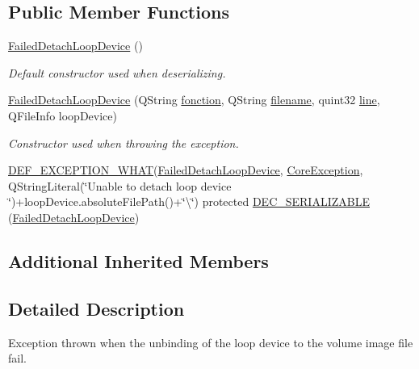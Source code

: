 \subsection*{Public Member Functions}
\begin{DoxyCompactItemize}
\item 
\hyperlink{class_gost_crypt_1_1_core_1_1_failed_detach_loop_device_a6df735e0deafe5aa995fdb4226ca7058}{Failed\+Detach\+Loop\+Device} ()
\begin{DoxyCompactList}\small\item\em Default constructor used when deserializing. \end{DoxyCompactList}\item 
\hyperlink{class_gost_crypt_1_1_core_1_1_failed_detach_loop_device_a6583fca405ad2531d902daf9459e1fbe}{Failed\+Detach\+Loop\+Device} (Q\+String \hyperlink{class_gost_crypt_1_1_gost_crypt_exception_a29b8c93d5efbb1ff369107385725a939}{fonction}, Q\+String \hyperlink{class_gost_crypt_1_1_gost_crypt_exception_a749a12375f4ba9d502623b99d8252f38}{filename}, quint32 \hyperlink{class_gost_crypt_1_1_gost_crypt_exception_abf506d911f12a4e969eea500f90bd32c}{line}, Q\+File\+Info loop\+Device)
\begin{DoxyCompactList}\small\item\em Constructor used when throwing the exception. \end{DoxyCompactList}\item 
\hyperlink{_gost_crypt_exception_8h_a5bc1e1c6c9d6f46c84eeba49e33355f9}{D\+E\+F\+\_\+\+E\+X\+C\+E\+P\+T\+I\+O\+N\+\_\+\+W\+H\+AT}(\hyperlink{class_gost_crypt_1_1_core_1_1_failed_detach_loop_device}{Failed\+Detach\+Loop\+Device}, \hyperlink{class_gost_crypt_1_1_core_1_1_core_exception}{Core\+Exception}, Q\+String\+Literal(\char`\"{}Unable to detach loop device \char`\"{})+loop\+Device.\+absolute\+File\+Path()+\char`\"{}\textbackslash{}\char`\"{}) protected \hyperlink{class_gost_crypt_1_1_core_1_1_failed_detach_loop_device_a190fb46905d199675d9400694b47d2cd}{D\+E\+C\+\_\+\+S\+E\+R\+I\+A\+L\+I\+Z\+A\+B\+LE} (\hyperlink{class_gost_crypt_1_1_core_1_1_failed_detach_loop_device}{Failed\+Detach\+Loop\+Device})
\end{DoxyCompactItemize}
\subsection*{Additional Inherited Members}


\subsection{Detailed Description}
Exception thrown when the unbinding of the loop device to the volume image file fail. 

